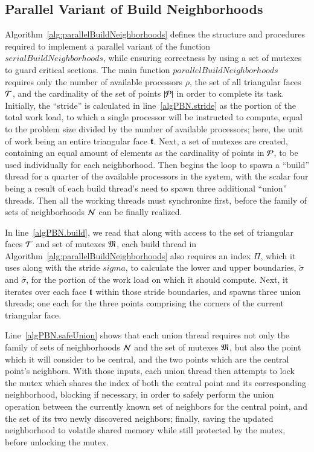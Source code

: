 %
%
\subsection{Parallel Variant of Build Neighborhoods}
\label{ch6sBNPssPVBN}
Algorithm~\ref{alg:parallelBuildNeighborhoods} defines the structure and procedures required to implement a parallel variant of the function $\mathit{serialBuildNeighborhoods}$, while ensuring correctness by using a set of mutexes to guard critical sections. The main function $\mathit{parallelBuildNeighborhoods}$ requires only the number of available processors $\rho$, the set of all triangular faces $\mathcal{T}$, and the cardinality of the set of points $|\mathcal{P}|$ in order to complete its task. Initially, the ``stride'' is calculated in line~\ref{algPBN.stride} as the portion of the total work load, to which a single processor will be instructed to compute, equal to the problem size divided by the number of available processors; here, the unit of work being an entire triangular face $\mathbf{t}$. Next, a set of mutexes are created, containing an equal amount of elements as the cardinality of points in $\mathcal{P}$, to be used individually for each neighborhood.  Then begins the loop to spawn a ``build'' thread for a quarter of the available processors in the system, with the scalar four being a result of each build thread's need to spawn three additional ``union'' threads. Then all the working threads must synchronize first, before the family of sets of neighborhoods $\mathcal{N}$ can be finally realized.

In line~\ref{algPBN.build}, we read that along with access to the set of triangular faces $\mathcal{T}$ and set of mutexes $\mathfrak{M}$, each build thread in Algorithm~\ref{alg:parallelBuildNeighborhoods} also requires an index $\Pi$, which it uses along with the stride $sigma$, to calculate the lower and upper boundaries, $\check{\sigma}$ and $\hat{\sigma}$, for the portion of the work load on which it should compute. Next, it iterates over each face $\mathbf{t}$ within those stride boundaries, and spawns three union threads; one each for the three points comprising the corners of the current triangular face.

Line~\ref{algPBN.safeUnion} shows that each union thread requires not only the family of sets of neighborhoods $\mathcal{N}$ and the set of mutexes $\mathfrak{M}$, but also the point which it will consider to be central, and the two points which are the central point's neighbors. With those inputs, each union thread then attempts to lock the mutex which shares the index of both the central point and its corresponding neighborhood, blocking if necessary, in order to safely perform the union operation between the currently known set of neighbors for the central point, and the set of its two newly discovered neighbors; finally, saving the updated neighborhood to volatile shared memory while still protected by the mutex, before unlocking the mutex.

